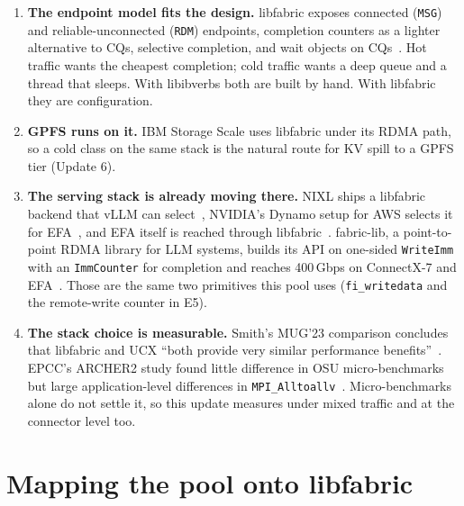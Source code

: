 \documentclass[11pt,letterpaper]{article}
\begin{document}
\begin{enumerate}
\item \textbf{The endpoint model fits the design.} libfabric exposes connected (\texttt{MSG}) and reliable-unconnected (\texttt{RDM}) endpoints, completion counters as a lighter alternative to CQs, selective completion, and wait objects on CQs~\cite{grun2015,fi_endpoint,fi_cntr}. Hot traffic wants the cheapest completion; cold traffic wants a deep queue and a thread that sleeps. With libibverbs both are built by hand. With libfabric they are configuration.
\item \textbf{GPFS runs on it.} IBM Storage Scale uses libfabric under its RDMA path, so a cold class on the same stack is the natural route for KV spill to a GPFS tier (Update 6).
\item \textbf{The serving stack is already moving there.} NIXL ships a libfabric backend that vLLM can select~\cite{nixl_lf,vllm_nixl}, NVIDIA's Dynamo setup for AWS selects it for EFA~\cite{dynamo_efa}, and EFA itself is reached through libfabric~\cite{chen_efa}. fabric-lib, a point-to-point RDMA library for LLM systems, builds its API on one-sided \texttt{WriteImm} with an \texttt{ImmCounter} for completion and reaches 400\,Gbps on ConnectX-7 and EFA~\cite{fabriclib}. Those are the same two primitives this pool uses (\texttt{fi\_writedata} and the remote-write counter in E5).
\item \textbf{The stack choice is measurable.} Smith's MUG'23 comparison concludes that libfabric and UCX ``both provide very similar performance benefits''~\cite{smith_mug23}. EPCC's ARCHER2 study found little difference in OSU micro-benchmarks but large application-level differences in \texttt{MPI\_Alltoallv}~\cite{bareford2022}. Micro-benchmarks alone do not settle it, so this update measures under mixed traffic and at the connector level too.
\end{enumerate}

\section{Mapping the pool onto libfabric}
\end{document}
